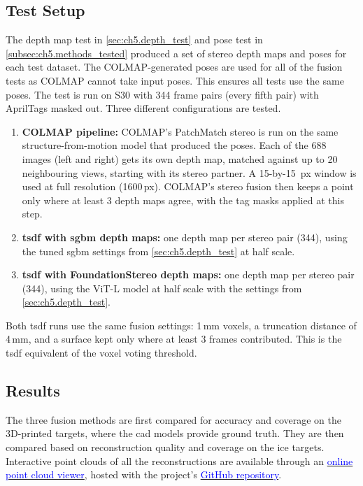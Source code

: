 
\subsection{Test Setup}
\label{subsec:ch5.fusion_tested}

The depth map test in \autoref{sec:ch5.depth_test} and pose test in \autoref{subsec:ch5.methods_tested} produced a set of stereo depth maps and poses for each test dataset.
The COLMAP-generated poses are used for all of the fusion tests as COLMAP cannot take input poses.
This ensures all tests use the same poses. 
The test is run on S30 with 344 frame pairs (every fifth pair) with AprilTags masked out. Three different configurations are tested.

\begin{enumerate}
    \item \textbf{COLMAP pipeline:} COLMAP's PatchMatch stereo is run on the same structure-from-motion model
    that produced the poses. Each of the 688 images (left and right) gets its own depth map, matched against up
    to 20 neighbouring views, starting with its stereo partner. A 15-by-15 \,px window is used at full
    resolution (1600\,px). COLMAP's stereo fusion then keeps a point only where at least 3 depth maps agree, with
    the tag masks applied at this step.
    \item \textbf{\gls{tsdf} with \gls{sgbm} depth maps:} one depth map per stereo pair (344), using the tuned \gls{sgbm} settings
    from \autoref{sec:ch5.depth_test} at half scale.
    \item \textbf{\gls{tsdf} with FoundationStereo depth maps:} one depth map per stereo pair (344), using the ViT-L
    model at half scale with the settings from \autoref{sec:ch5.depth_test}.
\end{enumerate}

Both \gls{tsdf} runs use the same fusion settings: 1\,mm voxels, a truncation distance of 4\,mm, and a surface kept only
where at least 3 frames contributed. This is the \gls{tsdf} equivalent of the voxel voting threshold. 

\subsection{Results}
\label{subsec:ch5.fusion_results}
The three fusion methods are first compared for accuracy and coverage on the 3D-printed targets, where the \gls{cad}
models provide ground truth. They are then compared based on reconstruction quality and coverage on the ice targets. Interactive
point clouds of all the reconstructions are available through an
\href{https://glenojones.github.io/UCT_Final_Year_Project/viewer/}{\textcolor{blue}{online point cloud viewer}},
hosted with the project's \href{https://github.com/GlenOJones/UCT_Final_Year_Project}{\textcolor{blue}{GitHub repository}}.

